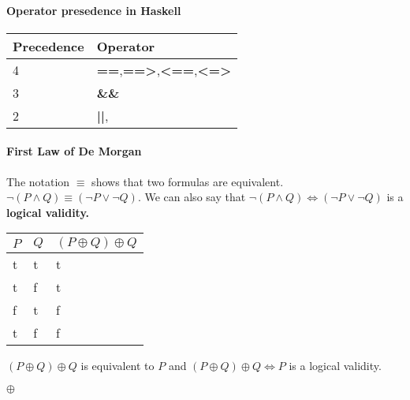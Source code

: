 \documentclass[11pt]{article}
\begin{document}
\paragraph{Operator presedence in Haskell} 
\begin{tabular}{|l|l|}
\hline
	Precedence & Operator\\
\hline
	4 & \textbf{==},\textbf{==>},\textbf{<==},\textbf{<=>}\\
\hline
	3 & \textbf{\&\&}\\
\hline
	2 & \textbf{||},\\
\hline
\end{tabular}

\paragraph{First Law of De Morgan}
The notation $\equiv$ shows that two formulas are equivalent. $\lnot (P \land Q) \equiv (\lnot P \lor \lnot Q)$. We can also say that $\lnot (P \land Q) \iff (\lnot P \lor \lnot Q)$ is a \textbf{logical validity.}


\begin{tabular}{l|l|l}
	$P$ & $Q$ & $(P \oplus Q) \oplus Q$\\ \hline
	t & t & t\\
	t & f & t\\
	f & t & f\\
	t & f & f\\
\end{tabular}

$(P \oplus Q) \oplus Q$ is equivalent to $P$ and $(P \oplus Q) \oplus Q \iff P$ is a logical validity.


$\oplus$
\end{document}
